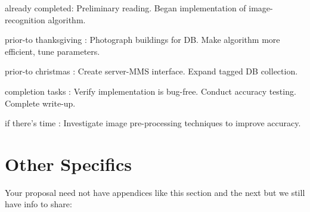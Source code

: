 \documentclass{sig-alternate}
\begin{document}
\begin{itemize*}
	\item {\sc already completed}: Preliminary reading. Began implementation of image-recognition algorithm.\vspace{3pt}
	\item {\sc prior-to thanksgiving} : Photograph buildings for DB. Make algorithm more efficient, tune parameters.\vspace{3pt}
	\item {\sc prior-to christmas} : Create server-MMS interface. Expand tagged DB collection.\vspace{3pt}
	\item {\sc completion tasks} : Verify implementation is bug-free. Conduct accuracy testing. Complete write-up.\vspace{3pt}
	\item {\sc if there's time} : Investigate image pre-processing techniques to improve accuracy.
\end{itemize*}


\vspace{175pt}

\appendix
\section{Other Specifics}
\label{app:other_specifics}
Your proposal need not have appendices like this section and the next
but we still have info to share:

\end{document}
